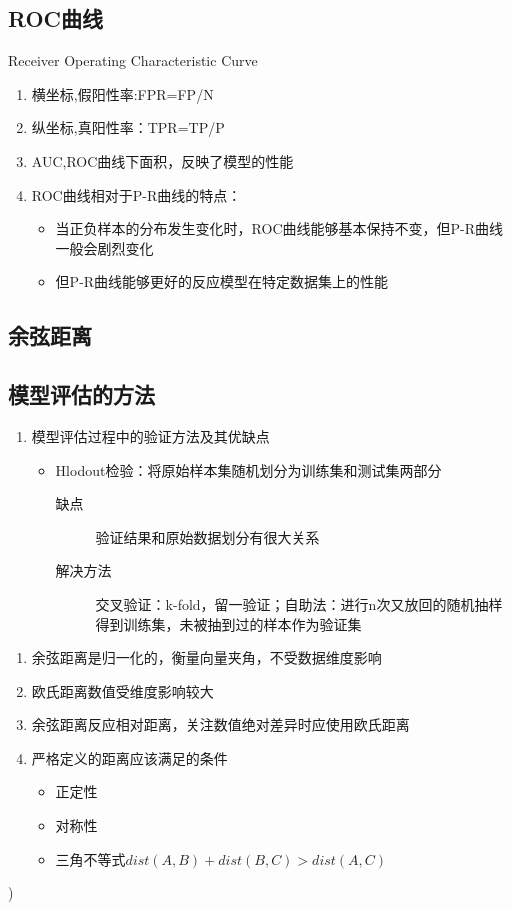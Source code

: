 \documentclass[UTF8]{article}%
\begin{document}
		\subsection{ROC曲线}
		Receiver Operating Characteristic Curve
		\begin{enumerate}
			\item 横坐标,假阳性率:FPR=FP/N
			\item 纵坐标,真阳性率：TPR=TP/P
			\item AUC,ROC曲线下面积，反映了模型的性能
			\item ROC曲线相对于P-R曲线的特点：
				\begin{itemize}
					\item 当正负样本的分布发生变化时，ROC曲线能够基本保持不变，但P-R曲线一般会剧烈变化
					\item 但P-R曲线能够更好的反应模型在特定数据集上的性能
				\end{itemize}
		\end{enumerate}
	
		\subsection{余弦距离}
		\subsection{模型评估的方法}
			\begin{enumerate}
				\item 模型评估过程中的验证方法及其优缺点
				\begin{itemize}
					\item Hlodout检验：将原始样本集随机划分为训练集和测试集两部分
					\begin{description}
						\item[缺点] 验证结果和原始数据划分有很大关系
						\item[解决方法] 交叉验证：k-fold，留一验证；自助法：进行n次又放回的随机抽样得到训练集，未被抽到过的样本作为验证集
					\end{description}
				\end{itemize}
			\end{enumerate}
	\begin{enumerate}
		\item 余弦距离是归一化的，衡量向量夹角，不受数据维度影响
		\item 欧氏距离数值受维度影响较大
		\item 余弦距离反应相对距离，关注数值绝对差异时应使用欧氏距离
		\item 严格定义的距离应该满足的条件
		\begin{itemize}
			\item 正定性
			\item 对称性
			\item 三角不等式$dist(A,B)+dist(B,C)>dist(A,C)$
		\end{itemize}
	\end{enumerate})
	
\end{document}
